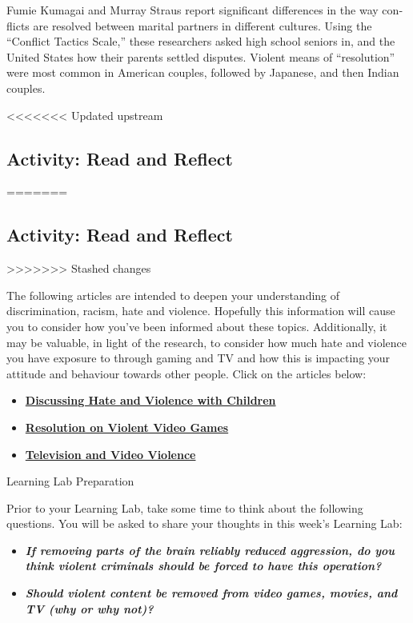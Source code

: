 \documentclass[
]{book}
\providecommand{\tightlist}{%
  \setlength{\itemsep}{0pt}\setlength{\parskip}{0pt}}
\begin{document}
Fumie Kumagai and Murray Straus report significant differences in the way con­flicts are resolved between marital partners in different cultures. Using the ``Conflict Tactics Scale,'' these researchers asked high school seniors in, and the United States how their parents settled disputes. Violent means of ``resolution'' were most common in American couples, followed by Japanese, and then Indian couples.

<<<<<<< Updated upstream
\hypertarget{activity-read-and-reflect-9}{%
\subsection*{Activity: Read and Reflect}\label{activity-read-and-reflect-9}}
=======
\hypertarget{activity-read-and-reflect-8}{%
\subsection*{Activity: Read and Reflect}\label{activity-read-and-reflect-8}}
>>>>>>> Stashed changes

\begin{reflect}
The following articles are intended to deepen your understanding of discrimination, racism, hate and violence. Hopefully this information will cause you to consider how you've been informed about these topics. Additionally, it may be valuable, in light of the research, to consider how much hate and violence you have exposure to through gaming and TV and how this is impacting your attitude and behaviour towards other people. Click on the articles below:

\begin{itemize}
\tightlist
\item
  \href{https://www.adl.org/education/resources/tools-and-strategies/discussing-hate-and-violence-with-children}{\textbf{Discussing Hate and Violence with Children}}\\
\item
  \href{https://www.apa.org/about/policy/violent-video-games}{\textbf{Resolution on Violent Video Games}}\\
\item
  \href{https://www.apa.org/action/resources/research-in-action/protect}{\textbf{Television and Video Violence}}
\end{itemize}

{Learning Lab Preparation}

Prior to your Learning Lab, take some time to think about the following questions. You will be asked to share your thoughts in this week's Learning Lab:

\begin{itemize}
\tightlist
\item
  \textbf{\emph{If removing parts of the brain reliably reduced aggression, do you think violent criminals should be forced to have this operation?}}
\item
  \textbf{\emph{Should violent content be removed from video games, movies, and TV (why or why not)?}}
\end{itemize}
\end{reflect}
\end{document}

